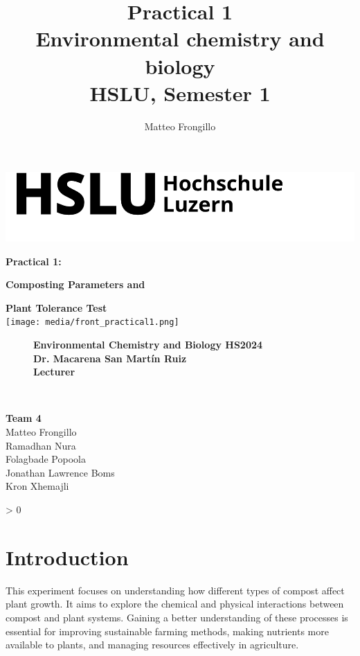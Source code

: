\documentclass{article}
\title{\textbf{Practical 1 \\ Environmental chemistry and biology \\ HSLU, Semester 1}}
\author{Matteo Frongillo}
\makeatletter
\newcommand{\wrapfill}{
    \par
    \ifnum \value{WF@wrappedlines} > 0
        \addtocounter{WF@wrappedlines}{-1}%
        \null\vspace{
            \arabic{WF@wrappedlines}
            \baselineskip
        }
        \WFclear
    \fi
    \phantom{}
}
\makeatother
\begin{document}
\hypersetup{citecolor=black}

\begin{minipage}{0.7\textwidth}
    \vspace*{-.8cm} \hspace*{-0.3cm}
    \includegraphics[width=.5\textwidth]{media/hslu-logo.png}
\end{minipage}

\vspace*{2cm}

\textbf{\huge Practical 1:}\\[.75cm]
\begin{center}
    \textbf{\huge Composting Parameters and}
    
    \textbf{\huge Plant Tolerance Test}\\[1cm]
    
    \texttt{[image: media/front\_practical1.png]}\\
\end{center}

\vspace*{1cm}

\setlength{\intextsep}{0pt}%
\begin{figure}
    \textbf{\Large Environmental Chemistry and Biology HS2024\\[.5cm]
    \large Dr. Macarena San Martín Ruiz\\
    Lecturer}
    \vspace{-2.1cm}
\end{figure}

\phantom{}\\[-1cm]

\begin{flushright}
        \large
        \textbf{Team 4}\\
        Matteo Frongillo\\
        Ramadhan Nura\\
        Folagbade Popoola\\
        Jonathan Lawrence Boms\\
        Kron Xhemajli
\end{flushright}
\wrapfill

\tableofcontents
\pagebreak

\section{Introduction}
This experiment focuses on understanding how different types of compost affect plant
growth. It aims to explore the chemical and physical interactions between compost and
plant systems. Gaining a better understanding of these processes is essential for
improving sustainable farming methods, making nutrients more available to plants, and
managing resources effectively in agriculture.
\end{document}
